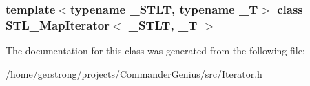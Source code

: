 \subsubsection*{template$<$typename \_\-STLT, typename \_\-T$>$ class STL\_\-MapIterator$<$ \_\-STLT, \_\-T $>$}



The documentation for this class was generated from the following file:\begin{DoxyCompactItemize}
\item 
/home/gerstrong/projects/CommanderGenius/src/Iterator.h\end{DoxyCompactItemize}
